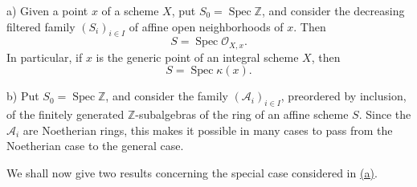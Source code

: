 \smallskip
{}\label{par:sga3-VIB-10.10-a}%
\noindent\textup{a)}
Given a point \(x\) of a scheme \(X\), put
\(S_0=\operatorname{Spec}\mathbb Z\), and consider the
decreasing filtered family \((S_i)_{i\in I}\) of
affine open neighborhoods of \(x\). Then
\[
  S=\operatorname{Spec}\mathcal O_{X,x}.
\]
In particular, if \(x\) is the generic point of an integral
scheme \(X\), then
\[
  S=\operatorname{Spec}\kappa(x).
\]

\smallskip
{}\label{par:sga3-VIB-10.10-b}%
\noindent\textup{b)}
Put \(S_0=\operatorname{Spec}\mathbb Z\), and consider the
family \((\mathcal A_i)_{i\in I}\), preordered by inclusion,
of the finitely generated \(\mathbb Z\)-subalgebras of the
ring of an affine scheme \(S\). Since the
\(\mathcal A_i\) are Noetherian rings, this makes it possible
in many cases to pass from the Noetherian case to the general
case.

We shall now give two results concerning the special case
considered in \hyperref[par:sga3-VIB-10.10-a]{(a)}.%

